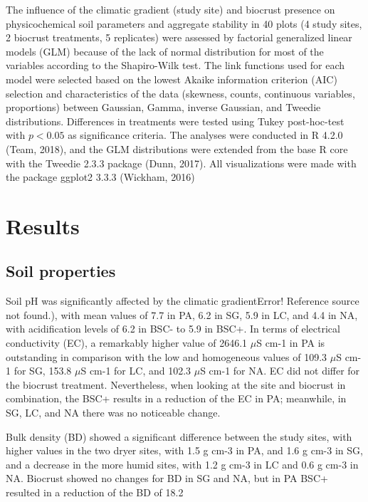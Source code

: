 {The influence of the climatic gradient (study site) and biocrust presence on physicochemical soil parameters and aggregate stability in 40 plots (4 study sites, 2 biocrust treatments, 5 replicates) were assessed by factorial generalized linear models (GLM) because of the lack of normal distribution for most of the variables according to the Shapiro-Wilk test. The link functions used for each model were selected based on the lowest Akaike information criterion (AIC) selection and characteristics of the data (skewness, counts, continuous variables, proportions) between Gaussian, Gamma, inverse Gaussian, and Tweedie distributions. Differences in treatments were tested using Tukey post-hoc-test with $p <0.05$ as significance criteria. The analyses were conducted in R 4.2.0 (Team, 2018), and the GLM distributions were extended from the base R core with the Tweedie 2.3.3 package (Dunn, 2017). All visualizations were made with the package ggplot2 3.3.3 (Wickham, 2016)

\section{Results}
\subsection{Soil properties}

Soil pH was significantly affected by the climatic gradientError! Reference source not found.), with mean values of 7.7 in PA, 6.2 in SG, 5.9 in LC, and 4.4 in NA, with acidification levels of 6.2 in BSC- to 5.9 in BSC+. In terms of electrical conductivity (EC), a remarkably higher value of 2646.1 $\mu$S cm-1 in PA is outstanding in comparison with the low and homogeneous values of 109.3 $\mu$S cm-1 for SG, 153.8 $\mu$S cm-1 for LC, and 102.3 $\mu$S cm-1 for NA. EC did not differ for the biocrust treatment. Nevertheless, when looking at the site and biocrust in combination, the BSC+ results in a reduction of the EC in PA; meanwhile, in SG, LC, and NA there was no noticeable change. 

Bulk density (BD) showed a significant difference between the study sites, with higher values in the two dryer sites, with 1.5 g cm-3 in PA, and 1.6 g cm-3 in SG, and a decrease in the more humid sites, with 1.2 g cm-3 in LC and 0.6 g cm-3 in NA. Biocrust showed no changes for BD in SG and NA, but in PA BSC+ resulted in a reduction of the BD of 18.2%

}
